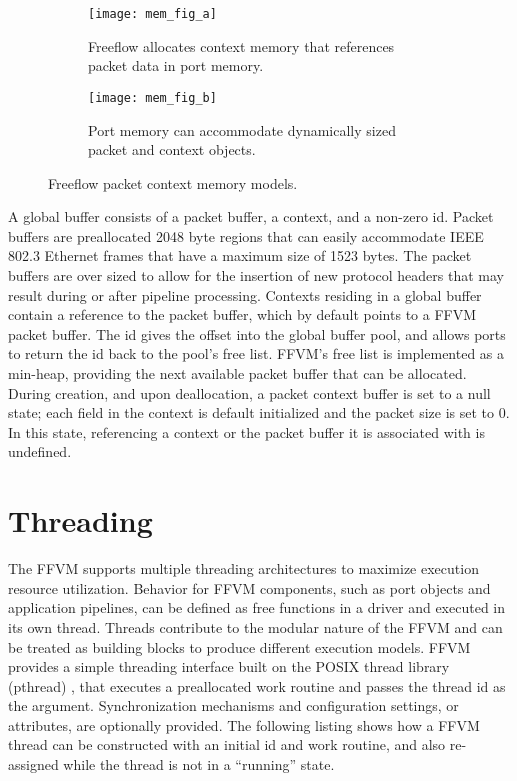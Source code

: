\begin{figure}[h]
  \centering
  \begin{subfigure}[b]{0.48\textwidth}
    \centering
    \texttt{[image: mem\_fig\_a]}
    \caption{Freeflow allocates context memory that references packet data
    in port memory.}
  \end{subfigure}
  \hfill
  \begin{subfigure}[b]{0.48\textwidth}
    \centering
    \texttt{[image: mem\_fig\_b]}
    \caption{Port memory can accommodate dynamically sized packet and context
    objects.}
  \end{subfigure}
  \caption{Freeflow packet context memory models.}
  \label{mem_model}
\end{figure}

A global buffer consists of a packet buffer, a context, and a non-zero
id. Packet buffers are preallocated 2048 byte regions that can easily
accommodate IEEE 802.3 Ethernet frames that have a maximum size of 1523 bytes.
The packet buffers are over sized to allow for the insertion of new protocol
headers that may result during or after pipeline processing. Contexts residing
in a global buffer contain a reference to the packet buffer, which by default
points to a FFVM packet buffer. The id gives the offset into the global buffer
pool, and allows ports to return the id back to the pool's free list. FFVM's
free list is implemented as a min-heap, providing the next available packet
buffer that can be allocated. During creation, and upon deallocation, a packet
context buffer is set to a null state; each field in the context is default
initialized and the packet size is set to 0. In this state, referencing a
context or the packet buffer it is associated with is undefined.


\section{Threading}
\label{vm:threading}
The FFVM supports multiple threading architectures to maximize execution
resource utilization. Behavior for FFVM components, such as port objects and
application pipelines, can be defined as free functions in a driver and
executed in its own thread. Threads contribute to the modular nature of the
FFVM and can be treated as building blocks to produce different execution
models. FFVM provides a simple threading interface built on the POSIX thread
library (pthread) \cite{pthread}, that executes a preallocated work routine
and passes the thread id as the argument. Synchronization mechanisms and
configuration settings, or attributes, are optionally provided. The following
listing shows how a FFVM thread can be constructed with an initial id and work
routine, and also re-assigned while the thread is not in a ``running'' state.

